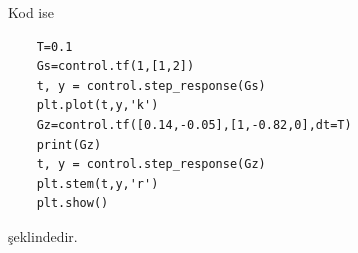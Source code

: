 \begin{enumerate}
    Kod ise
    \begin{lstlisting}
    T=0.1
    Gs=control.tf(1,[1,2])
    t, y = control.step_response(Gs)
    plt.plot(t,y,'k')
    Gz=control.tf([0.14,-0.05],[1,-0.82,0],dt=T)
    print(Gz)
    t, y = control.step_response(Gz)
    plt.stem(t,y,'r')
    plt.show()
    \end{lstlisting}
    şeklindedir.
\end{enumerate}